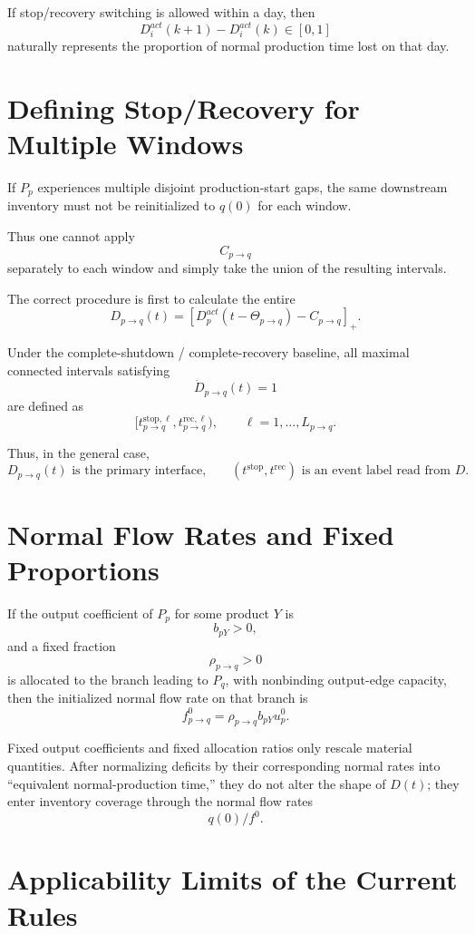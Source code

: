 \documentclass[11pt]{article}
\begin{document}
If stop/recovery switching is allowed within a day, then
\[
D_i^{act}(k+1)-D_i^{act}(k)\in[0,1]
\]
naturally represents the proportion of normal production time lost on that day.

\section{Defining Stop/Recovery for Multiple Windows}

If \(P_p\) experiences multiple disjoint production-start gaps,
the same downstream inventory must not be reinitialized to \(q(0)\) for each window.

Thus one cannot apply
\[
C_{p\to q}
\]
separately to each window and simply take the union of the resulting intervals.

The correct procedure is first to calculate the entire
\[
D_{p\to q}(t)
=
[D_p^{act}(t-\Theta_{p\to q})-C_{p\to q}]_+.
\]

Under the complete-shutdown / complete-recovery baseline,
all maximal connected intervals satisfying
\[
\dot D_{p\to q}(t)=1
\]
are defined as
\[
\boxed{
[t_{p\to q}^{\mathrm{stop},\ell},
t_{p\to q}^{\mathrm{rec},\ell}),
\qquad
\ell=1,\ldots,L_{p\to q}.
}
\tag{30}
\]

Thus, in the general case,
\[
\boxed{
D_{p\to q}(t)
\text{ is the primary interface,}
\qquad
(t^{\mathrm{stop}},t^{\mathrm{rec}})
\text{ is an event label read from \(D\).}
}
\]

\section{Normal Flow Rates and Fixed Proportions}

If the output coefficient of \(P_p\) for some product \(Y\) is
\[
b_{pY}>0,
\]
and a fixed fraction
\[
\rho_{p\to q}>0
\]
is allocated to the branch leading to \(P_q\), with nonbinding output-edge capacity,
then the initialized normal flow rate on that branch is
\[
\boxed{
f_{p\to q}^0
=
\rho_{p\to q}b_{pY}u_p^0.
}
\tag{31}
\]

Fixed output coefficients and fixed allocation ratios only rescale material quantities.
After normalizing deficits by their corresponding normal rates into ``equivalent normal-production time,''
they do not alter the shape of \(D(t)\);
they enter inventory coverage through the normal flow rates
\[
q(0)/f^0.
\]

\section{Applicability Limits of the Current Rules}
\end{document}
